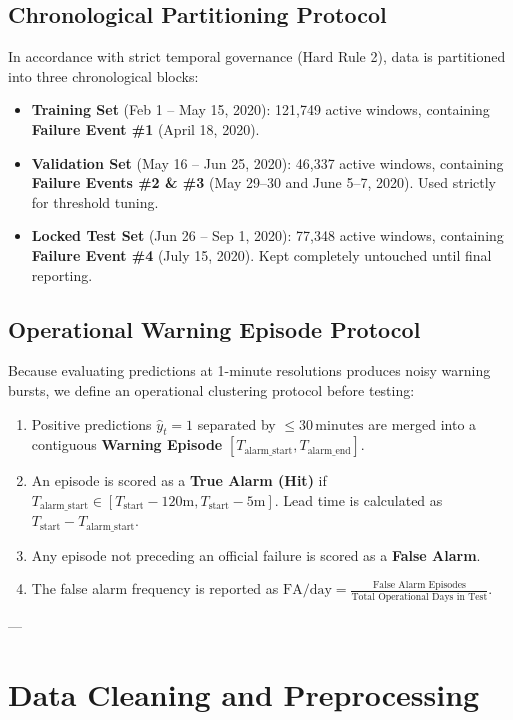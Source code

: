 \documentclass[10pt,twocolumn,a4paper]{article}
\begin{document}
\subsection{Chronological Partitioning Protocol}
In accordance with strict temporal governance (Hard Rule 2), data is partitioned into three chronological blocks:
\begin{itemize}
    \item \textbf{Training Set} (Feb 1 -- May 15, 2020): 121,749 active windows, containing \textbf{Failure Event \#1} (April 18, 2020).
    \item \textbf{Validation Set} (May 16 -- Jun 25, 2020): 46,337 active windows, containing \textbf{Failure Events \#2 \& \#3} (May 29--30 and June 5--7, 2020). Used strictly for threshold tuning.
    \item \textbf{Locked Test Set} (Jun 26 -- Sep 1, 2020): 77,348 active windows, containing \textbf{Failure Event \#4} (July 15, 2020). Kept completely untouched until final reporting.
\end{itemize}

\subsection{Operational Warning Episode Protocol}
Because evaluating predictions at 1-minute resolutions produces noisy warning bursts, we define an operational clustering protocol before testing:
\begin{enumerate}
    \item Positive predictions $\hat{y}_t = 1$ separated by $\le 30\,\text{minutes}$ are merged into a contiguous \textbf{Warning Episode} $[T_{\text{alarm\_start}}, T_{\text{alarm\_end}}]$.
    \item An episode is scored as a \textbf{True Alarm (Hit)} if $T_{\text{alarm\_start}} \in [T_{\text{start}} - 120\text{m}, T_{\text{start}} - 5\text{m}]$. Lead time is calculated as $T_{\text{start}} - T_{\text{alarm\_start}}$.
    \item Any episode not preceding an official failure is scored as a \textbf{False Alarm}.
    \item The false alarm frequency is reported as $\text{FA/day} = \frac{\text{False Alarm Episodes}}{\text{Total Operational Days in Test}}$.
\end{enumerate}

---

\section{Data Cleaning and Preprocessing}
\end{document}
